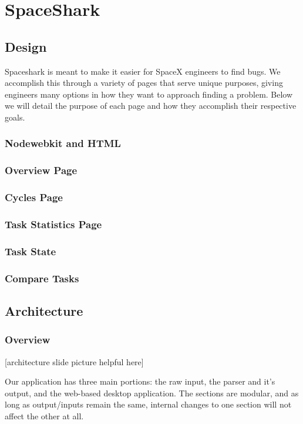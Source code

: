 \documentclass{hmcclinic}
\begin{document}
\chapter{SpaceShark}
\section{Design} %

  Spaceshark is meant to make it easier for SpaceX engineers to find bugs. We
  accomplish this through a variety of pages that serve unique purposes, giving
  engineers many options in how they want to approach finding a problem. Below
  we will detail the purpose of each page and how they accomplish their
  respective goals.

  \subsection{Nodewebkit and HTML} %
  \subsection{Overview Page}
  \subsection{Cycles Page}
  \subsection{Task Statistics Page}
  \subsection{Task State}
  \subsection{Compare Tasks}

\section{Architecture} %

  \subsection{Overview}

  [architecture slide picture helpful here]

  Our application has three main portions: the raw input, the parser and it's
  output, and the web-based desktop application. The sections are modular, and
  as long as output/inputs remain the same, internal changes to one section will
  not affect the other at all.
\end{document}
